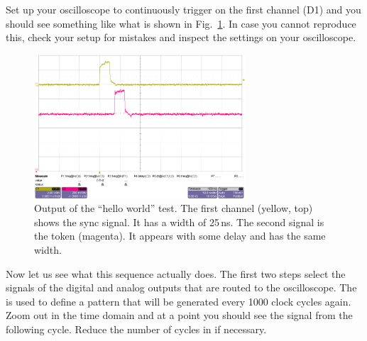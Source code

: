 Set up your oscilloscope to continuously trigger on the first channel (D1) and you should see something like what is shown in Fig.~\ref{fig:tut_scope1}. In case you cannot reproduce this, check your setup for mistakes and inspect the settings on your oscilloscope.
\begin{figure}[h]
    \begin{center}
	\includegraphics[width=0.7\textwidth]{img/tut_scope1.png}
	\caption{Output of the \enquote{hello world} test. The first channel (yellow, top) shows the sync signal. It has a width of 25\,ns. The second signal is the token (magenta). It appears with some delay and has the same width.}
	\label{fig:tut_scope1}
    \end{center}
\end{figure}

Now let us see what this sequence actually does.  The first two steps select the signals of the digital and analog outputs that are routed to the oscilloscope. The  is used to define a pattern that will be generated every 1000 clock cycles again. Zoom out in the time domain and at a point you should see the signal from the following cycle. Reduce the number of cycles in  if necessary.


